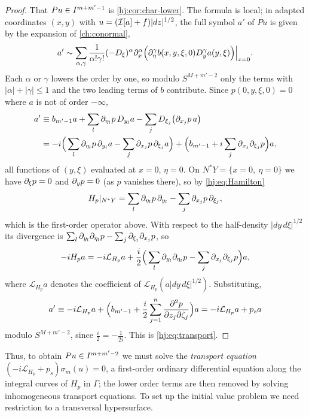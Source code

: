 \begin{proof}
  That $Pu\in I^{m+m'-1}$ is \cref{hj:cor:char-lower}.  The formula is local; in
  adapted coordinates $(x,y)$ with $u=(\mathcal{I}[a]+f)|dz|^{1/2}$, the full symbol
  $a'$ of $Pu$ is given by the expansion of \cref{ch:conormal},
  \begin{equation*}
    a'\sim\sum_{\alpha,\gamma}\frac1{\alpha!\gamma!}(-D_\xi)^\alpha\partial_x^\alpha
    \Big(\partial_\eta^\gamma b(x,y,\xi,0)D_y^\gamma a(y,\xi)\Big)\Big|_{x=0}.
  \end{equation*}
  Each $\alpha$ or $\gamma$ lowers the order by one, so modulo $S^{M+m'-2}$
  only the terms with $|\alpha|+|\gamma|\le1$ and the two leading terms of $b$
  contribute.  Since $p(0,y,\xi,0)=0$ where $a$ is not of order $-\infty$,
  \begin{align*}
    a'&\equiv b_{m'-1}a+\sum_l\partial_{\eta_l}p\,D_{y_l}a
       -\sum_jD_{\xi_j}\big(\partial_{x_j}p\,a\big)\\
      &=-i\Big(\sum_l\partial_{\eta_l}p\,\partial_{y_l}a-\sum_j\partial_{x_j}p\,\partial_{\xi_j}a\Big)
       +\Big(b_{m'-1}+i\sum_j\partial_{x_j}\partial_{\xi_j}p\Big)a,
  \end{align*}
  all functions of $(y,\xi)$ evaluated at $x=0$, $\eta=0$.  On $N^*Y=\{x=0,\
  \eta=0\}$ we have $\partial_\xi p=0$ and $\partial_yp=0$ (as $p$ vanishes there), so by
  \eqref{hj:eq:Hamilton}
  \begin{equation*}
    H_p|_{N^*Y}=\sum_l\partial_{\eta_l}p\,\partial_{y_l}-\sum_j\partial_{x_j}p\,\partial_{\xi_j},
  \end{equation*}
  which is the first-order operator above.  With respect to the half-density
  $|dy\,d\xi|^{1/2}$ its divergence is $\sum_l\partial_{y_l}\partial_{\eta_l}p-\sum_j
  \partial_{\xi_j}\partial_{x_j}p$, so
  \begin{equation*}
    -iH_pa=-i\mathcal L_{H_p}a+\frac i2\Big(\sum_l\partial_{y_l}\partial_{\eta_l}p-
    \sum_j\partial_{x_j}\partial_{\xi_j}p\Big)a,
  \end{equation*}
  where $\mathcal L_{H_p}a$ denotes the coefficient of
  $\mathcal L_{H_p}(a|dy\,d\xi|^{1/2})$.  Substituting,
  \begin{equation*}
    a'\equiv-i\mathcal L_{H_p}a+\Big(b_{m'-1}+\frac i2\sum_{j=1}^n
    \frac{\partial^2p}{\partial z_j\partial\zeta_j}\Big)a=-i\mathcal L_{H_p}a+p_sa
  \end{equation*}
  modulo $S^{M+m'-2}$, since $\frac i2=-\frac1{2i}$.  This is
  \eqref{hj:eq:transport}.
\end{proof}

Thus, to obtain $Pu\in I^{m+m'-2}$ we must solve the \emph{transport equation}
$(-i\mathcal L_{H_p}+p_s)\sigma_m(u)=0$, a first-order ordinary differential
equation along the integral curves of $H_p$ in $\Gamma$; the lower order terms
are then removed by solving inhomogeneous transport equations.  To set up the
initial value problem we need restriction to a transversal hypersurface.

